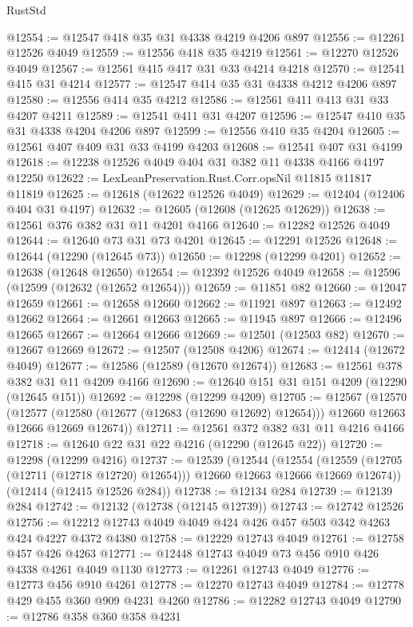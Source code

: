 \begin{lexlean}{RustStd}
\begin{coremodule}
@12554 := @12547 @418 @35 @31 @4338 @4219 @4206 @897
@12556 := @12261 @12526 @4049
@12559 := @12556 @418 @35 @4219
@12561 := @12270 @12526 @4049
@12567 := @12561 @415 @417 @31 @33 @4214 @4218
@12570 := @12541 @415 @31 @4214
@12577 := @12547 @414 @35 @31 @4338 @4212 @4206 @897
@12580 := @12556 @414 @35 @4212
@12586 := @12561 @411 @413 @31 @33 @4207 @4211
@12589 := @12541 @411 @31 @4207
@12596 := @12547 @410 @35 @31 @4338 @4204 @4206 @897
@12599 := @12556 @410 @35 @4204
@12605 := @12561 @407 @409 @31 @33 @4199 @4203
@12608 := @12541 @407 @31 @4199
@12618 := @12238 @12526 @4049 @404 @31 @382 @11 @4338 @4166 @4197 @12250
@12622 := LexLeanPreservation.Rust.Corr.opsNil @11815 @11817 @11819
@12625 := @12618 (@12622 @12526 @4049)
@12629 := @12404 (@12406 @404 @31 @4197)
@12632 := @12605 (@12608 (@12625 @12629))
@12638 := @12561 @376 @382 @31 @11 @4201 @4166
@12640 := @12282 @12526 @4049
@12644 := @12640 @73 @31 @73 @4201
@12645 := @12291 @12526
@12648 := @12644 (@12290 (@12645 @73))
@12650 := @12298 (@12299 @4201)
@12652 := @12638 (@12648 @12650)
@12654 := @12392 @12526 @4049
@12658 := @12596 (@12599 (@12632 (@12652 @12654)))
@12659 := @11851 @82
@12660 := @12047 @12659
@12661 := @12658 @12660
@12662 := @11921 @897
@12663 := @12492 @12662
@12664 := @12661 @12663
@12665 := @11945 @897
@12666 := @12496 @12665
@12667 := @12664 @12666
@12669 := @12501 (@12503 @82)
@12670 := @12667 @12669
@12672 := @12507 (@12508 @4206)
@12674 := @12414 (@12672 @4049)
@12677 := @12586 (@12589 (@12670 @12674))
@12683 := @12561 @378 @382 @31 @11 @4209 @4166
@12690 := @12640 @151 @31 @151 @4209 (@12290 (@12645 @151))
@12692 := @12298 (@12299 @4209)
@12705 := @12567
    (@12570
      (@12577 (@12580 (@12677 (@12683 (@12690 @12692) @12654))) @12660 @12663 @12666 @12669 @12674))
@12711 := @12561 @372 @382 @31 @11 @4216 @4166
@12718 := @12640 @22 @31 @22 @4216 (@12290 (@12645 @22))
@12720 := @12298 (@12299 @4216)
@12737 := @12539
    (@12544
      (@12554 (@12559 (@12705 (@12711 (@12718 @12720) @12654))) @12660 @12663 @12666 @12669 @12674))
    (@12414 (@12415 @12526 @284))
@12738 := @12134 @284
@12739 := @12139 @284
@12742 := @12132 (@12738 (@12145 @12739))
@12743 := @12742 @12526
@12756 := @12212 @12743 @4049 @4049 @424 @426 @457 @503 @342 @4263 @424 @4227 @4372 @4380
@12758 := @12229 @12743 @4049
@12761 := @12758 @457 @426 @4263
@12771 := @12448 @12743 @4049 @73 @456 @910 @426 @4338 @4261 @4049 @1130
@12773 := @12261 @12743 @4049
@12776 := @12773 @456 @910 @4261
@12778 := @12270 @12743 @4049
@12784 := @12778 @429 @455 @360 @909 @4231 @4260
@12786 := @12282 @12743 @4049
@12790 := @12786 @358 @360 @358 @4231

\end{coremodule}
\end{lexlean}
